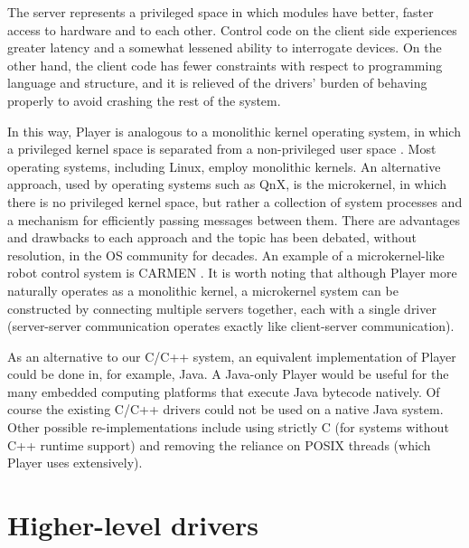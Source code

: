 The server represents a privileged space in which modules have better,
faster access to hardware and to each other.  Control code on the client
side experiences greater latency and a somewhat lessened ability to
interrogate devices.  On the other hand, the client code has fewer
constraints with respect to programming language and structure, and it is
relieved of the drivers' burden of behaving properly to avoid crashing the
rest of the system.

In this way, Player is analogous to a monolithic kernel operating system,
in which a privileged kernel space is separated from a non-privileged user
space \cite{32_osbook}.  Most operating systems, including Linux, employ
monolithic kernels.  An alternative approach, used by operating systems
such as QnX, is the microkernel, in which there is no privileged kernel
space, but rather a collection of system processes and a mechanism for
efficiently passing messages between them.  There are advantages and
drawbacks to each approach and the topic has been debated, without
resolution, in the OS community for decades.  An example of a
microkernel-like robot control system is CARMEN \cite{32_Roy03IROS}.  It is
worth noting that although Player more naturally operates as a monolithic
kernel, a microkernel system can be constructed by connecting multiple
servers together, each with a single driver (server-server communication
operates exactly like client-server communication).

As an alternative to our C/C++ system, an equivalent implementation of
Player could be done in, for example, Java.  A Java-only Player would be
useful for the many embedded computing platforms that execute Java bytecode
natively.  Of course the existing C/C++ drivers could not be used on a
native Java system.  Other possible re-implementations include using
strictly C (for systems without C++ runtime support) and removing the
reliance on POSIX threads (which Player uses extensively).


\section{Higher-level drivers}

